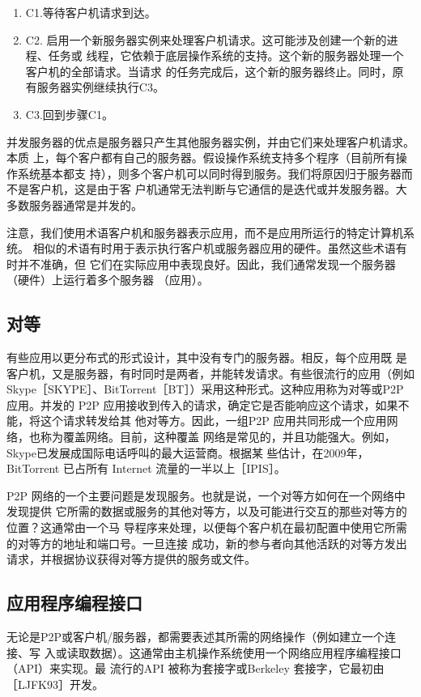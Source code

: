 \begin{enumerate}
    \item C1.等待客户机请求到达。
    \item C2. 启用一个新服务器实例来处理客户机请求。这可能涉及创建一个新的进程、任务或
    线程，它依赖于底层操作系统的支持。这个新的服务器处理一个客户机的全部请求。当请求
    的任务完成后，这个新的服务器终止。同时，原有服务器实例继续执行C3。
    \item C3.回到步骤C1。
\end{enumerate}
并发服务器的优点是服务器只产生其他服务器实例，并由它们来处理客户机请求。本质
上，每个客户都有自己的服务器。假设操作系统支持多个程序（目前所有操作系统基本都支
持），则多个客户机可以同时得到服务。我们将原因归于服务器而不是客户机，这是由于客
户机通常无法判断与它通信的是迭代或并发服务器。大多数服务器通常是并发的。

注意，我们使用术语客户机和服务器表示应用，而不是应用所运行的特定计算机系统。
相似的术语有时用于表示执行客户机或服务器应用的硬件。虽然这些术语有时并不准确，但
它们在实际应用中表现良好。因此，我们通常发现一个服务器（硬件）上运行着多个服务器
（应用）。
\subsection{对等}
有些应用以更分布式的形式设计，其中没有专门的服务器。相反，每个应用既
是客户机，又是服务器，有时同时是两者，并能转发请求。有些很流行的应用（例如
Skype［SKYPE］、BitTorrent［BT］）采用这种形式。这种应用称为对等或P2P应用。并发的
P2P 应用接收到传入的请求，确定它是否能响应这个请求，如果不能，将这个请求转发给其
他对等方。因此，一组P2P 应用共同形成一个应用网络，也称为覆盖网络。目前，这种覆盖
网络是常见的，并且功能强大。例如，Skype已发展成国际电话呼叫的最大运营商。根据某
些估计，在2009年，BitTorrent 已占所有 Internet 流量的一半以上［IPIS］。

P2P 网络的一个主要问题是发现服务。也就是说，一个对等方如何在一个网络中发现提供
它所需的数据或服务的其他对等方，以及可能进行交互的那些对等方的位置？这通常由一个马
导程序来处理，以便每个客户机在最初配置中使用它所需的对等方的地址和端口号。一旦连接
成功，新的参与者向其他活跃的对等方发出请求，并根据协议获得对等方提供的服务或文件。

\subsection{应用程序编程接口}
无论是P2P或客户机/服务器，都需要表述其所需的网络操作（例如建立一个连接、写
入或读取数据）。这通常由主机操作系统使用一个网络应用程序编程接口（API）来实现。最
流行的API 被称为套接字或Berkeley 套接字，它最初由［LJFK93］开发。

